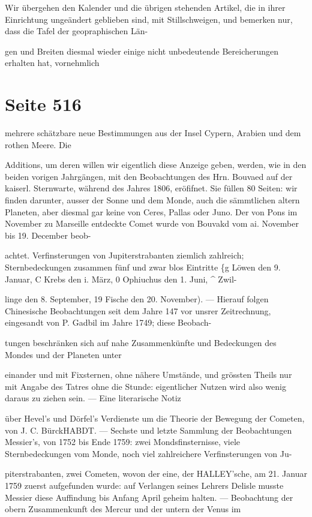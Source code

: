 \documentclass[10pt,a4paper]{article}
\begin{document}
Wir übergehen den Kalender und die übrigen stehenden Artikel, die in ihrer Einrichtung ungeändert geblieben sind, mit Stillschweigen, und bemerken nur, dass die Tafel der geopraphischen Län-

gen und Breiten diesmal wieder einige nicht unbedeutende Bereicherungen erhalten hat, vornehmlich


\newpage
\section*{Seite 516}
mehrere schätzbare neue Bestimmungen aus der Insel Cypern, Arabien und dem rothen Meere. Die

Additions, um deren willen wir eigentlich diese Anzeige geben, werden, wie in den beiden vorigen Jahrgängen, mit den Beobachtungen des Hrn. Bouvaed auf der kaiserl. Sternwarte, während des Jahres 1806, eröfifnet. Sie füllen 80 Seiten: wir finden darunter, ausser der Sonne und dem Monde, auch die sämmtlichen altern Planeten, aber diesmal gar keine von Ceres, Pallas oder Juno. Der von Pons im November zu Marseille entdeckte Comet wurde von Bouvakd vom ai. November bis 19. December beob-

achtet. Verfinsterungen von Jupiterstrabanten ziemlich zahlreich; Sternbedeckungen zusammen fünf und zwar blos Eintritte \{g Löwen den 9. Januar, C Krebs den i. März, 0 Ophiuchus den 1. Juni, \textasciicircum{} Zwil-

linge den 8. September, 19 Fische den 20. November). — Hierauf folgen Chinesische Beobachtungen seit dem Jahre 147 vor unsrer Zeitrechnung, eingesandt von P. Gadbil im Jahre 1749; diese Beobach-

tungen beschränken sich auf nahe Zusammenkünfte und Bedeckungen des Mondes und der Planeten unter

einander und mit Fixsternen, ohne nähere Umstände, und grössten Theils nur mit Angabe des Tatres ohne die Stunde: eigentlicher Nutzen wird also wenig daraus zu ziehen sein. — Eine literarische Notiz

über Hevel's und Dörfel's Verdienste um die Theorie der Bewegung der Cometen, von J. C. BürckHABDT. — Sechste und letzte Sammlung der Beobachtungen Messier's, von 1752 bis Ende 1759: zwei Mondsfinsternisse, viele Sternbedeckungen vom Monde, noch viel zahlreichere Verfinsterungen von Ju-

piterstrabanten, zwei Cometen, wovon der eine, der HALLEY'sche, am 21. Januar 1759 zuerst aufgefunden wurde: auf Verlangen seines Lehrers Delisle musste Messier diese Auffindung bis Anfang April geheim halten. — Beobachtung der obern Zusammenkunft des Mercur und der untern der Venus im
\end{document}

